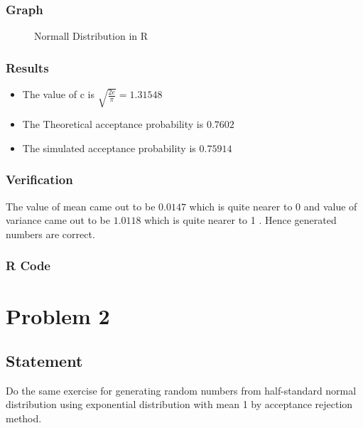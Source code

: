\documentclass[10pt]{article}
\begin{document}
\enlargethispage*{1000pt}
\subsubsection{Graph}
\begin{figure}[H]
		\centering
		\caption{Normall Distribution in R}
		\label{fig:q1_f1_a}
\end{figure}
\pagebreak



\subsubsection{Results}
\begin{itemize}
\item The value of c  is $\sqrt{\frac{2e}{\pi}} = 1.31548$
\item The Theoretical acceptance probability  is $0.7602$
\item The simulated acceptance probability is $0.75914$
\end{itemize}

\subsubsection{Verification}
The value of mean came out to be $ 0.0147 $ which is quite nearer to 0 and value of variance came out to be $ 1.0118 $ which is quite nearer to 1 . Hence generated numbers are correct.



\subsubsection{R Code}


\pagebreak

\section{Problem 2}

\subsection{Statement}

Do the same exercise for generating random numbers from half-standard normal distribution using exponential distribution with mean 1 by acceptance rejection method.
\end{document}
